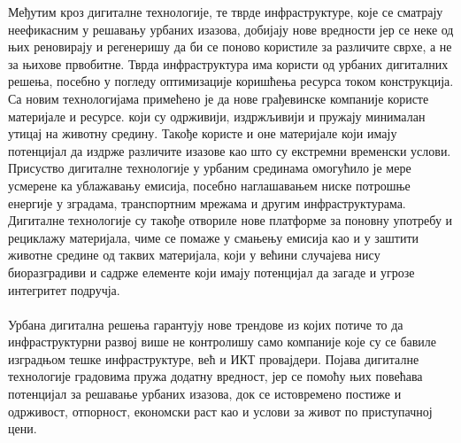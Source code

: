 \documentclass{article}
\begin{document}
Међутим кроз дигиталне технологије, те тврде инфраструктуре, које се сматрају неефикасним у решавању урбаних изазова, добијају нове вредности јер се неке од њих реновирају и регенеришу да би се поново користиле за различите сврхе, а не за њихове првобитне. Тврда инфраструктура има користи од урбаних дигиталних решења, посебно у погледу оптимизације коришћења ресурса током конструкција. \\

Са новим технологијама примећено је да нове грађевинске компаније користе материјале и ресурсе. који су одрживији, издржљивији и пружају минималан утицај на животну средину. Такође користе и оне материјале који имају потенцијал да издрже различите изазове као што су екстремни временски услови. Присуство дигиталне технологије у урбаним срединама омогућило је мере усмерене ка ублажавању емисија, посебно наглашавањем ниске потрошње енергије у зградама, транспортним мрежама и другим инфраструктурама. Дигиталне технологије су такође отвориле нове платформе за поновну употребу и рециклажу материјала, чиме се помаже у смањењу емисија као и у заштити животне средине од таквих материјала, који у већини случајева нису биоразградиви и садрже елементе који имају потенцијал да загаде и угрозе интегритет подручја. \\\\
Урбана дигитална решења гарантују нове трендове из којих потиче то да инфраструктурни развој више не контролишу само компаније које су се бавиле изградњом тешке инфраструктуре, већ и ИКТ провајдери. Појава дигиталне технологије градовима пружа додатну вредност, јер се помоћу њих повећава потенцијал за решавање урбаних изазова, док се истовремено постиже и одрживост, отпорност, економски раст као и услови за живот по приступачној цени. 
\end{document}
